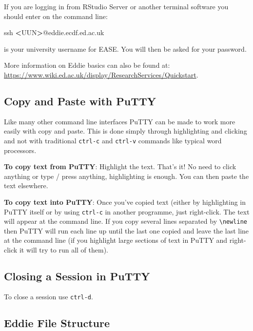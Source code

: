 \documentclass[
]{book}
\newenvironment{Shaded}{\begin{snugshade}}{\end{snugshade}}
\newcommand{\FunctionTok}[1]{\textcolor[rgb]{0.00,0.00,0.00}{#1}}
\newcommand{\NormalTok}[1]{#1}
\newcommand{\OperatorTok}[1]{\textcolor[rgb]{0.81,0.36,0.00}{\textbf{#1}}}
\begin{document}
If you are logging in from RStudio Server or another terminal software you should enter on the command line:

\begin{Shaded}
\begin{Highlighting}[]
\FunctionTok{ssh} \OperatorTok{\textless{}}\NormalTok{UUN}\OperatorTok{\textgreater{}}\NormalTok{@eddie.ecdf.ed.ac.uk}
\end{Highlighting}
\end{Shaded}

is your university username for EASE. You will then be asked for your password.

More information on Eddie basics can also be found at: \url{https://www.wiki.ed.ac.uk/display/ResearchServices/Quickstart}.

\hypertarget{copy-and-paste-with-putty}{%
\subsection{Copy and Paste with PuTTY}\label{copy-and-paste-with-putty}}

Like many other command line interfaces PuTTY can be made to work more easily with copy and paste. This is done simply through highlighting and clicking and not with traditional \texttt{ctrl-c} and \texttt{ctrl-v} commands like typical word processors.

\textbf{To copy text from PuTTY}: Highlight the text. That's it! No need to click anything or type / press anything, highlighting is enough. You can then paste the text elsewhere.

\textbf{To copy text into PuTTY}: Once you've copied text (either by highlighting in PuTTY itself or by using \texttt{ctrl-c} in another programme, just right-click. The text will appear at the command line. If you copy several lines separated by \texttt{\textbackslash{}newline} then PuTTY will run each line up until the last one copied and leave the last line at the command line (if you highlight large sections of text in PuTTY and right-click it will try to run all of them).

\hypertarget{closing-a-session-in-putty}{%
\subsection{Closing a Session in PuTTY}\label{closing-a-session-in-putty}}

To close a session use \texttt{ctrl-d}.

\hypertarget{eddie-file-structure}{%
\subsection{Eddie File Structure}\label{eddie-file-structure}}
\end{document}

